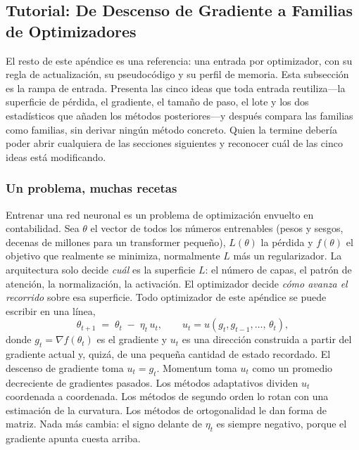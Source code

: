 \subsection{Tutorial: De Descenso de Gradiente a Familias de Optimizadores}
\label{sec:opt-tutorial}

El resto de este apéndice es una referencia: una entrada por optimizador, con
su regla de actualización, su pseudocódigo y su perfil de memoria. Esta
subsección es la rampa de entrada. Presenta las cinco ideas que toda entrada
reutiliza---la superficie de pérdida, el gradiente, el tamaño de paso, el lote
y los dos estadísticos que añaden los métodos posteriores---y después compara
las familias como familias, sin derivar ningún método concreto. Quien la
termine debería poder abrir cualquiera de las secciones siguientes y reconocer
cuál de las cinco ideas está modificando.

\subsubsection{Un problema, muchas recetas}
\label{sec:opt-tutorial-problem}

Entrenar una red neuronal es un problema de optimización envuelto en
contabilidad. Sea $\theta$ el vector de todos los números entrenables (pesos y
sesgos, decenas de millones para un transformer pequeño), $L(\theta)$ la
pérdida y $f(\theta)$ el objetivo que realmente se minimiza, normalmente $L$
más un regularizador. La arquitectura solo decide \emph{cuál} es la superficie
$L$: el número de capas, el patrón de atención, la normalización, la
activación. El optimizador decide \emph{cómo avanza el recorrido} sobre esa
superficie. Todo optimizador de este apéndice se puede escribir en una línea,
\begin{equation}
\theta_{t+1} \;=\; \theta_t \;-\; \eta_t\, u_t,
\qquad u_t = u\!\left(g_t, g_{t-1}, \dots,\, \theta_t\right),
\label{eq:opt-tut-generic}
\end{equation}
donde $g_t=\nabla f(\theta_t)$ es el gradiente y $u_t$ es una dirección
construida a partir del gradiente actual y, quizá, de una pequeña cantidad de
estado recordado. El descenso de gradiente toma $u_t=g_t$. Momentum toma $u_t$
como un promedio decreciente de gradientes pasados. Los métodos adaptativos
dividen $u_t$ coordenada a coordenada. Los métodos de segundo orden lo rotan
con una estimación de la curvatura. Los métodos de ortogonalidad le dan forma
de matriz. Nada más cambia: el signo delante de $\eta_t$ es siempre negativo,
porque el gradiente apunta cuesta arriba.

